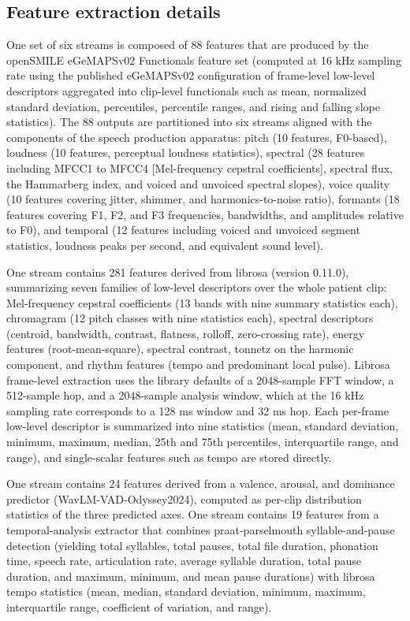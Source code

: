 \documentclass[utf8]{frontiers_suppmat} %
\begin{document}
\subsection{Feature extraction details}
\label{supp:feature-extraction}

One set of six streams is composed of 88 features that are produced by the openSMILE eGeMAPSv02 Functionals feature set (computed at 16 kHz sampling rate using the published eGeMAPSv02 configuration of frame-level low-level descriptors aggregated into clip-level functionals such as mean, normalized standard deviation, percentiles, percentile ranges, and rising and falling slope statistics). The 88 outputs are partitioned into six streams aligned with the components of the speech production apparatus: pitch (10 features, F0-based), loudness (10 features, perceptual loudness statistics), spectral (28 features including MFCC1 to MFCC4 [Mel-frequency cepstral coefficients], spectral flux, the Hammarberg index, and voiced and unvoiced spectral slopes), voice quality (10 features covering jitter, shimmer, and harmonics-to-noise ratio), formants (18 features covering F1, F2, and F3 frequencies, bandwidths, and amplitudes relative to F0), and temporal (12 features including voiced and unvoiced segment statistics, loudness peaks per second, and equivalent sound level).

One stream contains 281 features derived from librosa (version 0.11.0), summarizing seven families of low-level descriptors over the whole patient clip: Mel-frequency cepstral coefficients (13 bands with nine summary statistics each), chromagram (12 pitch classes with nine statistics each), spectral descriptors (centroid, bandwidth, contrast, flatness, rolloff, zero-crossing rate), energy features (root-mean-square), spectral contrast, tonnetz on the harmonic component, and rhythm features (tempo and predominant local pulse). Librosa frame-level extraction uses the library defaults of a 2048-sample FFT window, a 512-sample hop, and a 2048-sample analysis window, which at the 16 kHz sampling rate corresponds to a 128 ms window and 32 ms hop. Each per-frame low-level descriptor is summarized into nine statistics (mean, standard deviation, minimum, maximum, median, 25th and 75th percentiles, interquartile range, and range), and single-scalar features such as tempo are stored directly.

One stream contains 24 features derived from a valence, arousal, and dominance predictor (WavLM-VAD-Odyssey2024), computed as per-clip distribution statistics of the three predicted axes. One stream contains 19 features from a temporal-analysis extractor that combines praat-parselmouth syllable-and-pause detection (yielding total syllables, total pauses, total file duration, phonation time, speech rate, articulation rate, average syllable duration, total pause duration, and maximum, minimum, and mean pause durations) with librosa tempo statistics (mean, median, standard deviation, minimum, maximum, interquartile range, coefficient of variation, and range).
\end{document}
